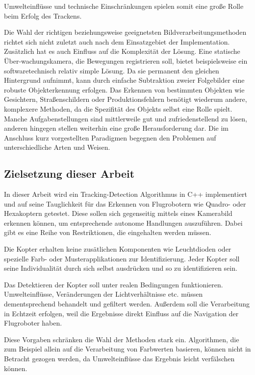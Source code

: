 Umwelteinflüsse und technische Einschränkungen spielen somit eine große Rolle beim Erfolg des Trackens\cite{OTS}. 

Die Wahl der richtigen beziehungsweise geeignetsten Bildverarbeitungsmethoden richtet sich nicht zuletzt auch nach dem Einsatzgebiet der Implementation. Zusätzlich hat es auch Einfluss auf die Komplexität der Lösung. Eine statische Über-wachungskamera, die Bewegungen registrieren soll, bietet beispielsweise ein softwaretechnisch relativ simple Lösung. Da sie permanent den gleichen Hintergrund aufnimmt, kann durch einfache Subtraktion zweier Folgebilder eine robuste Objekterkennung erfolgen. Das Erkennen von bestimmten Objekten wie Gesichtern, Straßenschildern oder Produktionsfehlern benötigt wiederum andere, komplexere Methoden, da die Spezifität des Objekts selbst eine Rolle spielt. Manche Aufgabenstellungen sind mittlerweile gut und zufriedenstellend zu lösen, anderen hingegen stellen weiterhin eine große Herausforderung dar. Die im Anschluss kurz vorgestellten Paradigmen begegnen den Problemen auf unterschiedliche Arten und Weisen.

\subsection{Zielsetzung dieser Arbeit}
In dieser Arbeit wird ein Tracking-Detection Algorithmus in C++ implementiert und auf seine Tauglichkeit für das Erkennen von Flugrobotern wie Quadro- oder Hexakoptern getestet. Diese sollen sich gegenseitig mittels eines Kamerabild erkennen können, um entsprechende autonome Handlungen auszuführen. Dabei gibt es eine Reihe von Restriktionen, die eingehalten werden müssen.

Die Kopter erhalten keine zusätlichen Komponenten wie Leuchtdioden oder spezielle Farb- oder Musterapplikationen zur Identifizierung. Jeder Kopter soll seine Individualität durch sich selbst ausdrücken und so zu identifizieren sein.

Das Detektieren der Kopter soll unter realen Bedingungen funktionieren. Umwelteinflüsse, Veränderungen der Lichtverhältnisse etc. müssen dementsprechend behandelt und gefiltert werden. Außerdem soll die Verarbeitung in Echtzeit erfolgen, weil die Ergebnisse direkt Einfluss auf die Navigation der Flugroboter haben.

Diese Vorgaben schränken die Wahl der Methoden stark ein. Algorithmen, die zum Beispiel allein auf die Verarbeitung von Farbwerten basieren, können nicht in Betracht gezogen werden, da Umwelteinflüsse das Ergebnis leicht verfälschen können.

